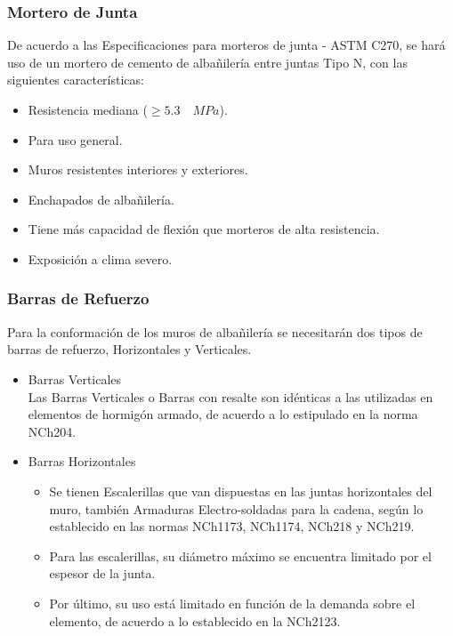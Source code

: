         \subsubsection{Mortero de Junta}
        De acuerdo a las Especificaciones para morteros de junta - ASTM C270, se hará uso de un mortero de cemento de albañilería entre juntas Tipo N, con las siguientes características:
        \begin{itemize}
            \item Resistencia mediana ($\geq 5.3 \quad MPa$).
            \item Para uso general.
            \item Muros resistentes interiores y exteriores.
            \item Enchapados de albañilería.
            \item Tiene más capacidad de flexión que morteros de alta resistencia.
            \item Exposición a clima severo.
        \end{itemize}
        
        \subsubsection{Barras de Refuerzo}
        Para la conformación de los muros de albañilería se necesitarán dos tipos de barras de refuerzo, Horizontales y Verticales.
            \begin{itemize}
                \item Barras Verticales\\
                Las Barras Verticales o Barras con resalte son idénticas a las utilizadas en elementos de hormigón armado, de acuerdo a lo estipulado en la norma NCh204.
                \item Barras Horizontales
                \begin{itemize}
                    \item Se tienen Escalerillas que van dispuestas en las juntas horizontales del muro, también Armaduras Electro-soldadas para la cadena, según lo establecido en las normas NCh1173, NCh1174, NCh218 y NCh219.
                    \item Para las escalerillas, su diámetro máximo se encuentra limitado por el espesor de la junta.
                    \item Por último, su uso está limitado en función de la demanda sobre el elemento, de acuerdo a lo establecido en la NCh2123.
                \end{itemize}
                
            \end{itemize}
